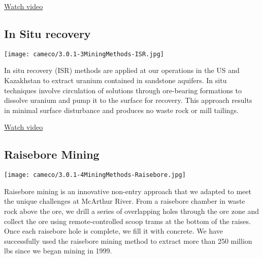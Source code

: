 \href{https://www.cameco.com/businesses/mining-methods/jet-boring-video}{Watch video}
\subsection*{In Situ recovery}
\label{ssec_insitu}
\texttt{[image: cameco/3.0.1-3MiningMethods-ISR.jpg]}

In situ recovery (ISR) methods are applied at our operations in the US and Kazakhstan to extract uranium contained in sandstone aquifers. In situ techniques involve circulation of solutions through ore-bearing formations to dissolve uranium and pump it to the surface for recovery. This approach results in minimal surface disturbance and produces no waste rock or mill tailings.

\href{https://www.cameco.com/businesses/mining-methods/in-situ-recovery-video}{Watch video}
\subsection*{Raisebore Mining}
\label{ssec_raisebore}
\texttt{[image: cameco/3.0.1-4MiningMethods-Raisebore.jpg]}

Raisebore mining is an innovative non-entry approach that we adapted to meet the unique challenges at McArthur River. From a raisebore chamber in waste rock above the ore, we drill a series of overlapping holes through the ore zone and collect the ore using remote-controlled scoop trams at the bottom of the raises. Once each raisebore hole is complete, we fill it with concrete. We have successfully used the raisebore mining method to extract more than 250 million lbs since we began mining in 1999.
